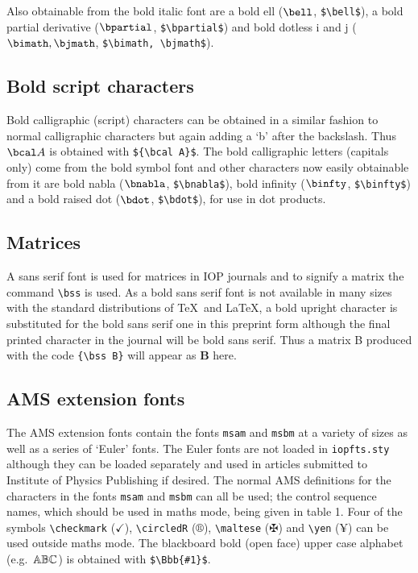 Also obtainable from the bold italic font are a bold ell ($\bell$,
\verb"$\bell$"), a bold partial derivative ($\bpartial$, \verb"$\bpartial$")
and bold dotless i and j ($\bimath, \bjmath$, \verb"$\bimath, \bjmath$").

\subsection{Bold script characters}
Bold calligraphic (script) characters can be obtained in a similar fashion 
to normal calligraphic characters but again adding a `b' after the backslash. 
Thus ${\bcal A}$ is obtained with \verb"${\bcal A}$". 
The bold calligraphic letters (capitals only) come from the
bold symbol font and other characters now easily obtainable from it
are bold nabla ($\bnabla$,
\verb"$\bnabla$"), bold infinity ($\binfty$, \verb"$\binfty$") and a bold
raised dot ($\bdot$, \verb"$\bdot$"), for use in dot products.


\subsection{Matrices}
A sans serif font is used for matrices in IOP journals
and to signify a matrix the
command \verb"\bss" is used. As a bold sans serif font is not available
in many sizes with the standard distributions of \TeX\ and \LaTeX, a bold
upright character is substituted for the bold sans serif one in this
preprint form although the final printed character in the journal will be
bold sans serif.
Thus a matrix B produced with the
code \verb"{\bss B}" will appear as {\bf B} here.

\subsection{AMS extension fonts}
The AMS extension fonts contain the fonts \verb"msam" and \verb"msbm" at a
variety of sizes as well as a series of `Euler' fonts. 
The Euler fonts are not
loaded in \verb"iopfts.sty" although they can be loaded separately and
used in articles submitted to Institute of Physics Publishing
if desired. The normal AMS definitions
for the characters in the
fonts \verb"msam" and \verb"msbm" can all be used; the control
sequence names, which should be used in maths mode, being given in table 1. 
Four of the symbols \verb"\checkmark" ($\checkmark$), \verb"\circledR"
($\circledR$), \verb"\maltese" ($\maltese$) and \verb"\yen" ($\yen$) 
can be used
outside maths mode.
The blackboard bold (open face)
upper case alphabet (e.g.\ $\Bbb{ABC}$) is obtained  with 
\verb"$\Bbb{#1}$".

